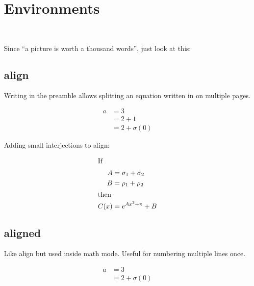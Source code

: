 \section{Environments}
\\

Since ``a picture is worth a thousand words'', just look at this:

\subsection{align}
Writing \code{\allowdisplaybreaks} in the preamble allows splitting an equation written in  on multiple pages.

\begin{example}
\begin{align}
  a & = 3\\
    & = 2 + 1 \nonumber \\
    & = 2 + \sigma(0)
\end{align}
\end{example}

Adding small interjections to align:\\
\begin{example}
\begin{minipage}{3in}
\begin{align*}
\intertext{If}
   A &= \sigma_1+\sigma_2\\
   B &= \rho_1+\rho_2\\
\intertext{then}
C(x) &= e^{Ax^2+\pi}+B
\end{align*} 
\end{minipage}
\end{example}

\subsection{aligned}
Like align but used inside math mode. Useful for numbering multiple lines once.

\begin{example}
\begin{equation}
\begin{aligned}
  a & = 3\\
    & = 2 + \sigma(0)
\end{aligned}
\end{equation}
\end{example}

